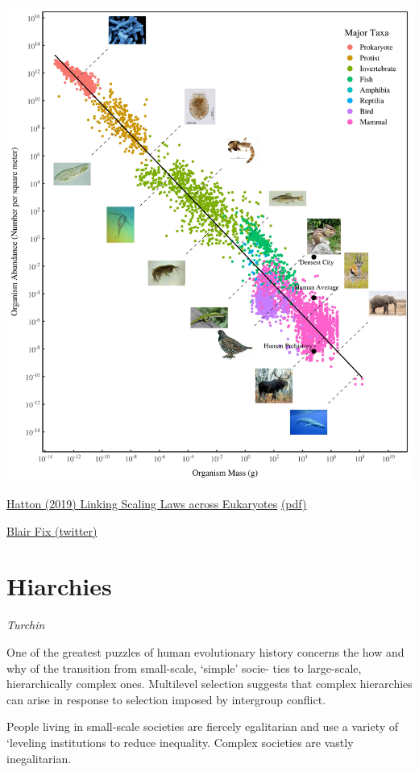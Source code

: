 \documentclass[
]{book}
\begin{document}
\includegraphics{fig/metabolic_scaling.jpeg}

\href{https://www.pnas.org/content/116/43/21616}{Hatton (2019) Linking Scaling Laws across Eukaryotes}
\href{pdf/Hatton_2019_Linking_Scaling_Laws_across_Eukaryotes.pdf}{(pdf)}

\href{https://twitter.com/blair_fix/status/1370181497097908225/photo/1}{Blair Fix (twitter)}

\hypertarget{hiarchies}{%
\section{Hiarchies}\label{hiarchies}}

\emph{Turchin}

One of the greatest puzzles of human evolutionary history concerns
the how and why of the transition from small-scale, `simple' socie-
ties to large-scale, hierarchically complex ones.
Multilevel selection suggests that complex hierarchies can arise in
response to selection imposed by intergroup conflict.

People living in small-scale societies are fiercely egalitarian and
use a variety of `leveling institutions to reduce inequality.
Complex societies are vastly inegalitarian.
\end{document}
